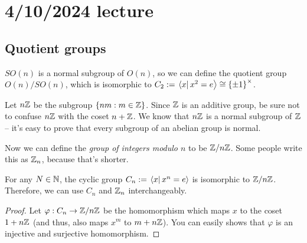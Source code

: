\documentclass[class=article, crop=false]{standalone}
\begin{document}
\section{4/10/2024 lecture}

\subsection{Quotient groups}
\begin{example}
    $SO(n)$ is a normal subgroup of $O(n)$, so we can define the quotient group $O(n)/SO(n)$, which is isomorphic to $C_2 := \left.\left\langle x\right\vert x^2=e \right\rangle \cong \left\{ \pm 1 \right\}^\times$.
\end{example}

Let $n \mathbb{Z}$ be the subgroup $ \left\{ nm:m \in \mathbb{Z} \right\}$. Since $\mathbb{Z}$ is an additive group, be sure not to confuse $n\mathbb{Z}$ with the coset $n+\mathbb{Z}$. We know that $n\mathbb{Z}$ is a normal subgroup of $\mathbb{Z}$ -- it's easy to prove that every subgroup of an abelian group is normal.
\par
Now we can define the \emph{group of integers modulo $n$} to be $\mathbb{Z}/n\mathbb{Z}$. Some people write this as $\mathbb{Z}_n$, because that's shorter.
\begin{thm}
    For any $N \in \mathbb{N}$, the cyclic group $C_n := \left.\left\langle x\right\vert x^n=e \right\rangle$ is isomorphic to $\mathbb{Z}/n\mathbb{Z}$. Therefore, we can use $C_n$ and $\mathbb{Z}_n$ interchangeably.
\end{thm}
\begin{proof}
    Let $\varphi: C_n \rightarrow \mathbb{Z}/n\mathbb{Z}$ be the homomorphism which maps $x$ to the coset $1+n\mathbb{Z}$ (and thus, also maps $x^m$ to $m+n\mathbb{Z}$). You can easily shows that $\varphi$ is an injective and surjective homomorphism.
\end{proof}
\end{document}

